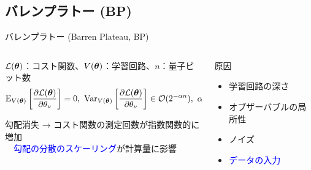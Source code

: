 \documentclass[dvipdfmx,10pt,aspectratio=169]{beamer}
\begin{document}
\subsection{バレンプラトー (BP)}
\begin{frame}{バレンプラトー (Barren Plateau, BP)}
    \begin{columns}
        \vspace*{-50pt}
        \begin{column}{0.65\textwidth}
            \begin{center}
                {\large\colorbox{blue!40}{}}
            \end{center}
            \vspace*{-10pt}
            \begin{definition}
                $\mathcal{L}(\vb*{\theta})$：コスト関数、$V(\vb*{\theta})$：学習回路、$n$：量子ビット数
                $$\operatorname{E}_{V(\vb*{\theta})}\left[\frac{\partial \mathcal{L}(\vb*{\theta})}{\partial \theta_\nu}\right] = 0, \,\,\operatorname{Var}_{V(\vb*{\theta})}\left[\frac{\partial \mathcal{L}(\vb*{\theta})}{\partial \theta_\nu}\right] \in \mathcal{O}(2^{-\alpha n}), \,\,\alpha > 0 $$
            \end{definition}
            勾配消失 → コスト関数の測定回数が指数関数的に増加\\
            　\textcolor{blue}{勾配の分散のスケーリング}が計算量に影響
            \begin{center}
            \end{center}
        \end{column}

        \begin{column}{0.35\textwidth}
            {\large 原因}
            \begin{itemize}
                \item 学習回路の深さ
                \item オブザーバブルの局所性
                \item ノイズ
                \item \textcolor{blue}{データの入力}
            \end{itemize}


\end{column}
\end{columns}
\end{frame}
\end{document}
